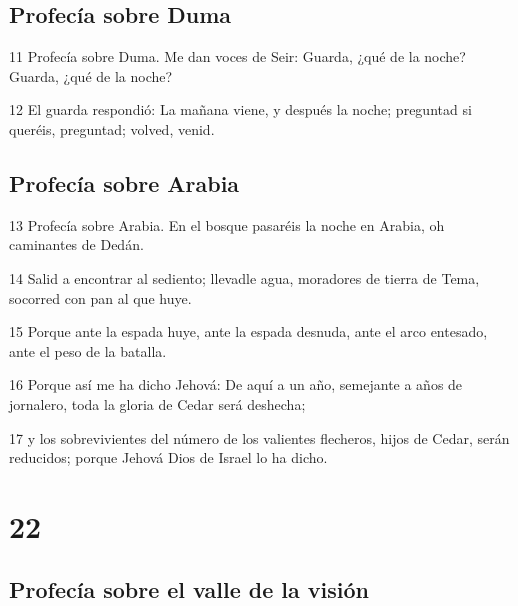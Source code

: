 \section*{Profecía sobre Duma}

\par 11 Profecía sobre Duma. Me dan voces de Seir: Guarda, ¿qué de la noche? Guarda, ¿qué de la noche?
\par 12 El guarda respondió: La mañana viene, y después la noche; preguntad si queréis, preguntad; volved, venid.

\section*{Profecía sobre Arabia}

\par 13 Profecía sobre Arabia. En el bosque pasaréis la noche en Arabia, oh caminantes de Dedán.
\par 14 Salid a encontrar al sediento; llevadle agua, moradores de tierra de Tema, socorred con pan al que huye.
\par 15 Porque ante la espada huye, ante la espada desnuda, ante el arco entesado, ante el peso de la batalla.
\par 16 Porque así me ha dicho Jehová: De aquí a un año, semejante a años de jornalero, toda la gloria de Cedar será deshecha;
\par 17 y los sobrevivientes del número de los valientes flecheros, hijos de Cedar, serán reducidos; porque Jehová Dios de Israel lo ha dicho.

\chapter{22}

\section*{Profecía sobre el valle de la visión}

